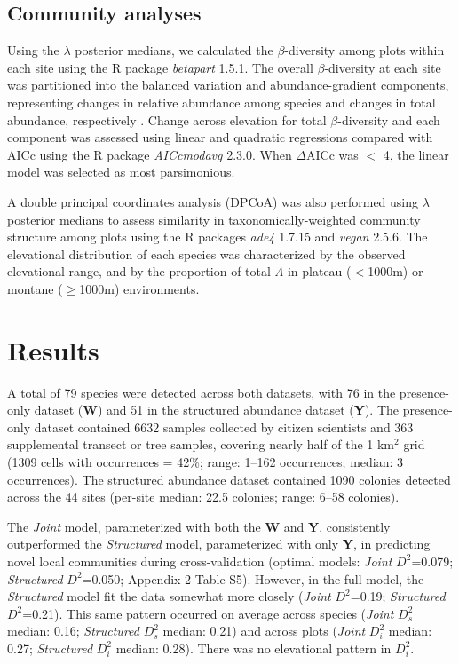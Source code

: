 \documentclass[preprint,review,times,12pt,3p]{elsarticle}
\begin{document}
\subsection{Community analyses}
Using the $\lambda$ posterior medians, we calculated the $\beta$-diversity among plots within each site using the R package \emph{betapart} 1.5.1. The overall $\beta$-diversity at each site was partitioned into the balanced variation and abundance-gradient components, representing changes in relative abundance among species and changes in total abundance, respectively \citep{Baselga2017}. Change across elevation for total $\beta$-diversity and each component was assessed using linear and quadratic regressions compared with AICc using the R package \emph{AICcmodavg} 2.3.0. When $\Delta$AICc was $<$ 4, the linear model was selected as most parsimonious. 

A double principal coordinates analysis (DPCoA) was also performed using $\lambda$ posterior medians to assess similarity in taxonomically-weighted community structure among plots \citep{Dray2015,Pavoine2019} using the R packages \emph{ade4} 1.7.15 and \emph{vegan} 2.5.6. The elevational distribution of each species was characterized by the observed elevational range, and by the proportion of total $\Lambda$ in plateau ($<$1000m) or montane ($\geq$1000m) environments.




\section{Results}
\label{S:3}
A total of 79 species were detected across both datasets, with 76 in the presence-only dataset (\textbf{W}) and 51 in the structured abundance dataset (\textbf{Y}). The presence-only dataset contained 6632 samples collected by citizen scientists and 363 supplemental transect or tree samples, covering nearly half of the 1 km$^2$ grid (1309 cells with occurrences = 42\%; range: 1–162 occurrences; median: 3 occurrences). The structured abundance dataset contained 1090 colonies detected across the 44 sites (per-site median: 22.5 colonies; range: 6–58 colonies). 

The \emph{Joint} model, parameterized with both the \textbf{W} and \textbf{Y}, consistently outperformed the \emph{Structured} model, parameterized with only \textbf{Y}, in predicting novel local communities during cross-validation (optimal models: \emph{Joint} $D^2$=0.079; \emph{Structured} $D^2$=0.050; Appendix 2 Table S5). However, in the full model, the \emph{Structured} model fit the data somewhat more closely (\emph{Joint} $D^2$=0.19; \emph{Structured} $D^2$=0.21). This same pattern occurred on average across species (\emph{Joint} $D^2_s$ median: 0.16; \emph{Structured} $D^2_s$ median: 0.21) and across plots (\emph{Joint} $D^2_i$ median: 0.27; \emph{Structured} $D^2_i$ median: 0.28). There was no elevational pattern in $D^2_i$.
\end{document}
